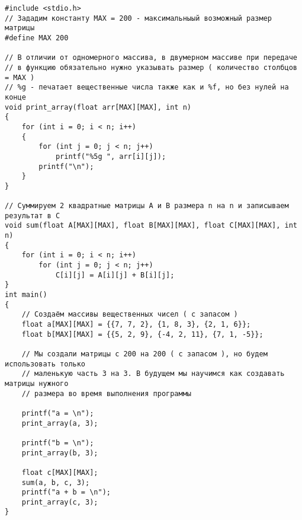 \documentclass{article}
\begin{document}
\begin{lstlisting}
#include <stdio.h>
// Зададим константу MAX = 200 - максимальныый возможный размер матрицы
#define MAX 200

// В отличии от одномерного массива, в двумерном массиве при передаче
// в функцию обязательно нужно указывать размер ( количество столбцов = MAX )
// %g - печатает вещественные числа также как и %f, но без нулей на конце
void print_array(float arr[MAX][MAX], int n) 
{
    for (int i = 0; i < n; i++) 
    {
        for (int j = 0; j < n; j++)
            printf("%5g ", arr[i][j]);
        printf("\n");
    }
}

// Суммируем 2 квадратные матрицы A и B размера n на n и записываем результат в C
void sum(float A[MAX][MAX], float B[MAX][MAX], float C[MAX][MAX], int n)
{
    for (int i = 0; i < n; i++) 
        for (int j = 0; j < n; j++)
            C[i][j] = A[i][j] + B[i][j];
}
int main() 
{
    // Создаём массивы вещественных чисел ( с запасом )
    float a[MAX][MAX] = {{7, 7, 2}, {1, 8, 3}, {2, 1, 6}};
    float b[MAX][MAX] = {{5, 2, 9}, {-4, 2, 11}, {7, 1, -5}};
    
    // Мы создали матрицы с 200 на 200 ( c запасом ), но будем использовать только 
    // маленькую часть 3 на 3. В будущем мы научимся как создавать матрицы нужного
    // размера во время выполнения программы 
    
    printf("a = \n");
    print_array(a, 3);
    
    printf("b = \n");
    print_array(b, 3);
    
    float c[MAX][MAX];
    sum(a, b, c, 3);    
    printf("a + b = \n");
    print_array(c, 3);
}

\end{lstlisting}
\newpage
\end{document}
